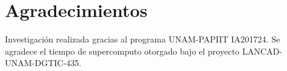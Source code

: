 \chapter{Agradecimientos}
Investigación realizada gracias al programa UNAM-PAPIIT IA201724. Se agradece el tiempo de supercomputo otorgado bajo el proyecto LANCAD-UNAM-DGTIC-435. 

